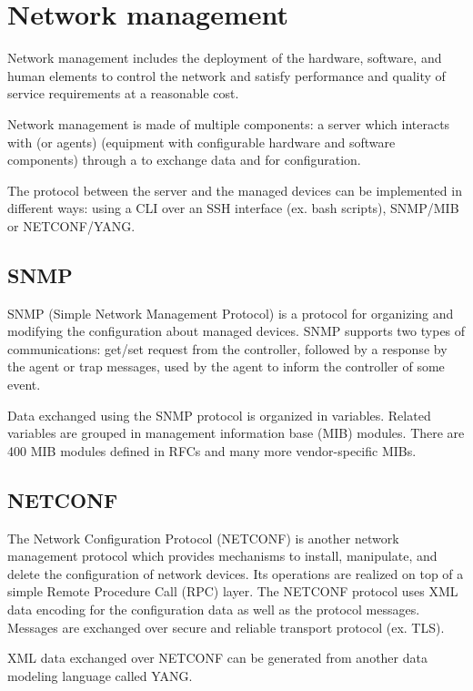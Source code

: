 
\section{Network management}
Network management includes the deployment of the hardware, software, and human elements to control the network and satisfy performance and quality of service requirements at a reasonable cost.

Network management is made of multiple components: a  server which interacts with  (or agents) (equipment with configurable hardware and software components) through a  to exchange data and for configuration.

The protocol between the server and the managed devices can be implemented in different ways: using a CLI over an SSH interface (ex. bash scripts), SNMP/MIB or NETCONF/YANG.

\subsection{SNMP}
SNMP (Simple Network Management Protocol) is a protocol for organizing and modifying the configuration about managed devices. SNMP supports two types of communications: get/set request from the controller, followed by a response by the agent or trap messages, used by the agent to inform the controller of some event.


Data exchanged using the SNMP protocol is organized in variables. Related variables are grouped in management information base (MIB) modules. There are 400 MIB modules defined in RFCs and many more vendor-specific MIBs.


\subsection{NETCONF}
The Network Configuration Protocol (NETCONF) is another network management protocol which provides mechanisms to install, manipulate, and delete the configuration of network devices. Its operations are realized on top of a simple Remote Procedure Call (RPC) layer. The NETCONF protocol uses XML data encoding for the configuration data as well as the protocol messages. Messages are exchanged over secure and reliable transport protocol (ex. TLS).

XML data exchanged over NETCONF can be generated from another data modeling language called YANG.

